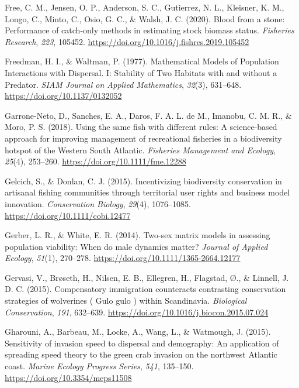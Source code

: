 \documentclass[
]{article}
\newlength{\cslhangindent}
\newlength{\cslentryspacingunit} %
\newenvironment{CSLReferences}[2] %
 {%
  \setlength{\parindent}{0pt}
  \ifodd #1
  \let\oldpar\par
  \def\par{\hangindent=\cslhangindent\oldpar}
  \fi
  \setlength{\parskip}{#2\cslentryspacingunit}
 }%
 {}
\begin{document}
\begin{CSLReferences}{1}{2}
\leavevmode{}%
Free, C. M., Jensen, O. P., Anderson, S. C., Gutierrez, N. L., Kleisner, K. M., Longo, C., Minto, C., Osio, G. C., \& Walsh, J. C. (2020). Blood from a stone: {Performance} of catch-only methods in estimating stock biomass status. \emph{Fisheries Research}, \emph{223}, 105452. \url{https://doi.org/10.1016/j.fishres.2019.105452}

\leavevmode{}%
Freedman, H. I., \& Waltman, P. (1977). Mathematical {Models} of {Population} {Interactions} with {Dispersal}. {I}: {Stability} of {Two} {Habitats} with and without a {Predator}. \emph{SIAM Journal on Applied Mathematics}, \emph{32}(3), 631--648. \url{https://doi.org/10.1137/0132052}

\leavevmode{}%
Garrone-Neto, D., Sanches, E. A., Daros, F. A. L. de M., Imanobu, C. M. R., \& Moro, P. S. (2018). Using the same fish with different rules: {A} science-based approach for improving management of recreational fisheries in a biodiversity hotspot of the {Western} {South} {Atlantic}. \emph{Fisheries Management and Ecology}, \emph{25}(4), 253--260. \url{https://doi.org/10.1111/fme.12288}

\leavevmode{}%
Gelcich, S., \& Donlan, C. J. (2015). Incentivizing biodiversity conservation in artisanal fishing communities through territorial user rights and business model innovation. \emph{Conservation Biology}, \emph{29}(4), 1076--1085. \url{https://doi.org/10.1111/cobi.12477}

\leavevmode{}%
Gerber, L. R., \& White, E. R. (2014). Two-sex matrix models in assessing population viability: When do male dynamics matter? \emph{Journal of Applied Ecology}, \emph{51}(1), 270--278. \url{https://doi.org/10.1111/1365-2664.12177}

\leavevmode{}%
Gervasi, V., Brøseth, H., Nilsen, E. B., Ellegren, H., Flagstad, Ø., \& Linnell, J. D. C. (2015). Compensatory immigration counteracts contrasting conservation strategies of wolverines ( {Gulo} gulo ) within {Scandinavia}. \emph{Biological Conservation}, \emph{191}, 632--639. \url{https://doi.org/10.1016/j.biocon.2015.07.024}

\leavevmode{}%
Gharouni, A., Barbeau, M., Locke, A., Wang, L., \& Watmough, J. (2015). Sensitivity of invasion speed to dispersal and demography: An application of spreading speed theory to the green crab invasion on the northwest {Atlantic} coast. \emph{Marine Ecology Progress Series}, \emph{541}, 135--150. \url{https://doi.org/10.3354/meps11508}


\end{CSLReferences}
\end{document}
